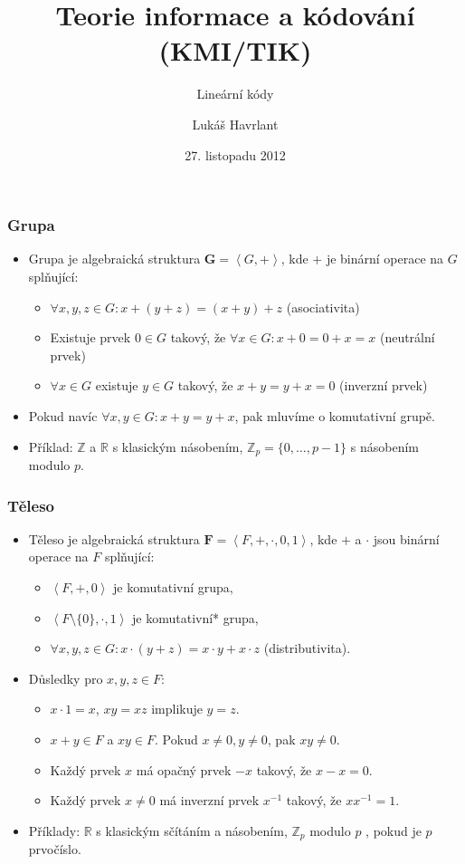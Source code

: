 \documentclass{beamer}
\title{Teorie informace a kódování (KMI/TIK)}
\subtitle{Lineární kódy}
\author{Lukáš Havrlant}
\date{27. listopadu 2012}
\institute{Univerzita Palackého}
\newcommand{\G}{\textbf{G}}
\newcommand{\F}{\textbf{F}}
\newenvironment{itemizex}%
  {\large \begin{itemize}%
    \setlength{\itemsep}{8pt}%
    \setlength{\parskip}{8pt}}%
  {\end{itemize}}
\begin{document}
\begin{frame}[t,plain]
\titlepage
\end{frame}



\begin{frame}[t,fragile]\frametitle{Grupa} 
    \begin{itemizex}
        \item Grupa je algebraická struktura $\G=\left<G,+\right>$, kde $+$ je binární operace na $G$ splňující: 
            \begin{itemize}
                \item $\forall x,y,z\in G: x+(y+z)=(x+y)+z$ (asociativita)
                \item Existuje prvek $0\in G$ takový, že $\forall x\in G: x+0=0+x=x$ (neutrální prvek)
                \item $\forall x\in G$ existuje $y\in G$ takový, že $x+y=y+x=0$ (inverzní prvek)
            \end{itemize}
        \item Pokud navíc $\forall x,y\in G: x+y=y+x$, pak mluvíme o komutativní grupě.
        \item Příklad: $\mathbb{Z}$ a $\mathbb{R}$ s klasickým násobením, $\mathbb{Z}_p=\{0,\dots,p-1\}$ s násobením modulo $p$.
    \end{itemizex}
\end{frame}


\begin{frame}[t,fragile]\frametitle{Těleso} 
    \begin{itemizex}
        \item Těleso je algebraická struktura $\F=\left<F,+,\cdot,0,1\right>$, kde $+$ a $\cdot$ jsou binární operace na $F$ splňující:
        \begin{itemize}
            \item $\left<F,+,0\right>$ je komutativní grupa,
            \item $\left<F\setminus\{0\},\cdot,1\right>$ je komutativní* grupa,
            \item $\forall x,y,z\in G: x\cdot(y+z)=x\cdot y+x\cdot z$ (distributivita).
        \end{itemize}
        \item Důsledky pro $x,y,z\in F$: 
        \begin{itemize}
            \item $x\cdot1=x$, $xy=xz$ implikuje $y=z$.
            \item $x+y\in F$ a $xy\in F$. Pokud $x\ne0, y\ne0$, pak $xy\ne0$.
            \item Každý prvek $x$ má opačný prvek $-x$ takový, že $x-x=0$.
            \item Každý prvek $x\ne0$ má inverzní prvek $x^{-1}$ takový, že $xx^{-1}=1$.
        \end{itemize}
        \item Příklady: $\mathbb{R}$ s klasickým sčítáním a násobením, $\mathbb{Z}_p$ modulo $p$ , pokud je $p$ prvočíslo.
    \end{itemizex}
\end{frame}
\end{document}
